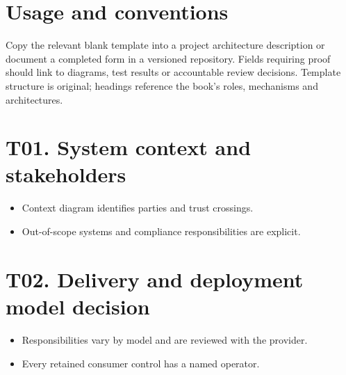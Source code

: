 \documentclass[10pt,letterpaper]{article}
\begin{document}
\sourceStatement
\tableofcontents
\newpage
\section{Usage and conventions}
Copy the relevant blank template into a project architecture description or document a completed form in a versioned repository. Fields requiring proof should link to diagrams, test results or accountable review decisions. Template structure is original; headings reference the book's roles, mechanisms and architectures.
\clearpage\section{T01. System context and stakeholders}
\par\vspace{8pt}
\begin{workbox}[title={Review gate}]
\begin{itemize}
\item Context diagram identifies parties and trust crossings.
\item Out-of-scope systems and compliance responsibilities are explicit.
\end{itemize}
\end{workbox}
\clearpage\section{T02. Delivery and deployment model decision}
\par\vspace{8pt}
\begin{workbox}[title={Review gate}]
\begin{itemize}
\item Responsibilities vary by model and are reviewed with the provider.
\item Every retained consumer control has a named operator.
\end{itemize}
\end{workbox}
\end{document}
